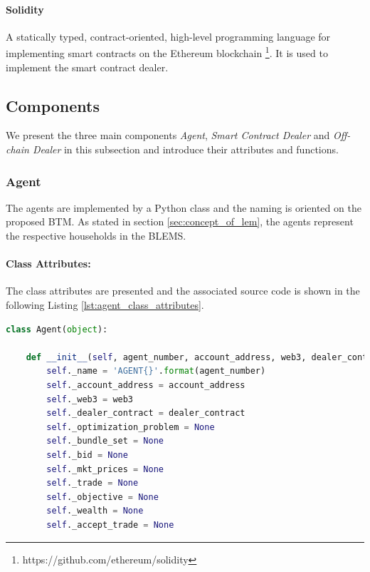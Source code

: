 \paragraph{Solidity}
A statically typed, contract-oriented, high-level programming language for implementing smart contracts on the Ethereum
blockchain \footnote{https://github.com/ethereum/solidity}.
It is used to implement the smart contract dealer. 

\clearpage
\subsection{Components}
\label{sec:components_of_simulation}
We present the three main components \textit{Agent}, \textit{Smart Contract Dealer} and \textit{Off-chain Dealer} 
in this subsection and introduce their attributes and functions. 

\subsubsection{Agent}
\label{sec:agent_class}
The agents are implemented by a Python class and the naming is oriented on the proposed BTM.
As stated in section \ref{sec:concept_of_lem}, the agents represent the respective households in the BLEMS. 


\paragraph{Class Attributes:} The class attributes are presented and the associated source code is shown
in the following Listing \ref{lst:agent_class_attributes}.

\begin{lstlisting}[label=lst:agent_class_attributes, caption=Class Attributes of Agent, language=Python]
    class Agent(object):

    def __init__(self, agent_number, account_address, web3, dealer_contract):
        self._name = 'AGENT{}'.format(agent_number)
        self._account_address = account_address
        self._web3 = web3
        self._dealer_contract = dealer_contract
        self._optimization_problem = None
        self._bundle_set = None
        self._bid = None
        self._mkt_prices = None
        self._trade = None
        self._objective = None
        self._wealth = None
        self._accept_trade = None
\end{lstlisting}

